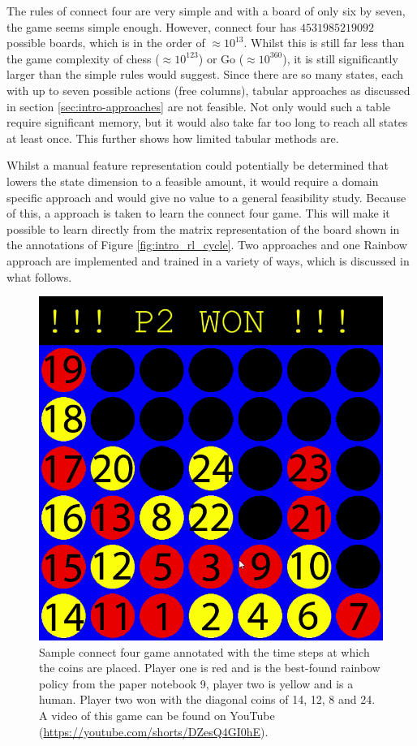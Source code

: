 The rules of connect four are very simple and with a board of only six by seven, the game seems simple enough.
However, connect four has $4531985219092$ possible boards, which is in the order of $\approx 10^{13}$.
Whilst this is still far less than the game complexity of chess ($\approx 10^{123}$) or Go ($\approx 10^{360}$), it is still significantly larger than the simple rules would suggest.
Since there are so many states, each with up to seven possible actions (free columns), tabular approaches as discussed in section \ref{sec:intro-approaches} are not feasible.
Not only would such a table require significant memory, but it would also take far too long to reach all states at least once.
This further shows how limited tabular methods are.

Whilst a manual feature representation could potentially be determined that lowers the state dimension to a feasible amount, it would require a domain specific approach and would give no value to a general feasibility study.
Because of this, a  approach is taken to learn the connect four game.
This will make it possible to learn directly from the matrix representation of the board shown in the annotations of Figure \ref{fig:intro_rl_cycle}.
Two  approaches and one Rainbow approach are implemented and trained in a variety of ways, which is discussed in what follows.


\begin{figure}[ht]
    \centering
    \includegraphics[width=0.7\linewidth]{images/ConnectZero_rainbow_diag_human_win.png}
    \captionsetup{width=0.9\linewidth}
    \captionsetup{justification=centering}
    \caption{Sample connect four game annotated with the time steps at which the coins are placed. Player one is red and is the best-found rainbow policy from the paper notebook 9, player two is yellow and is a human. Player two won with the diagonal coins of 14, 12, 8 and 24.  A video of this game can be found on YouTube (\url{https://youtube.com/shorts/DZesQ4GI0hE}).}
    \label{fig:rainbow_diagonal_win_turn_annotation}
\end{figure}

